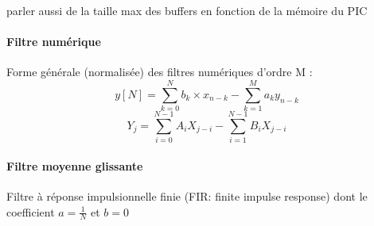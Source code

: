 \documentclass{article}
\begin{document}





    parler aussi de la taille max des buffers en fonction de la mémoire du PIC


    \paragraph{Filtre numérique}
    Forme générale (normalisée) des filtres numériques d'ordre M :
    $$ y[N] = \sum\limits_{k=0}^{N} b_k \times x_{n-k} - \sum\limits_{k=1}^{M} a_k y_{n-k} $$
    $$ Y_j = \sum\limits_{i=0}^{N-1} A_i X_{j-i} - \sum\limits_{i=1}^{N-1} B_i X_{j-i} $$

    \paragraph{Filtre moyenne glissante}
    Filtre à réponse impulsionnelle finie (FIR: finite impulse response) dont le coefficient $a = \frac{1}{N}$ et $b = 0$







\end{document}
